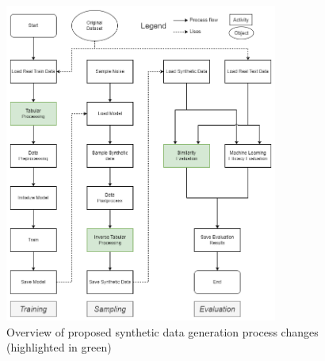 \begin{figure}[h]
	\centering
	\includegraphics[width=0.8\textwidth]{images/Overall_changed.png}
	\caption[Overview Software Changes]{Overview of proposed synthetic data generation process changes \\(highlighted in green)}
	\label{fig:Overall_changed}
\end{figure}

